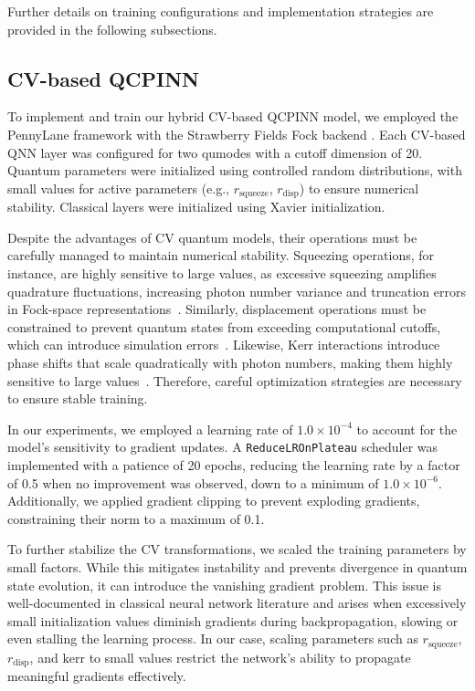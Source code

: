 Further details on training configurations and implementation strategies are provided in the following subsections.

\subsection{CV-based QCPINN}

To implement and train our hybrid CV-based QCPINN model, we employed the PennyLane framework \cite{bergholm2018pennylane} with the Strawberry Fields Fock backend \cite{killoran2019strawberry}. Each CV-based QNN layer was configured for two qumodes with a cutoff dimension of 20. Quantum parameters were initialized using controlled random distributions, with small values for active parameters (e.g., $r_{\text{squeeze}}$, $r_{\text{disp}}$) to ensure numerical stability. Classical layers were initialized using Xavier initialization.
  
Despite the advantages of CV quantum models, their operations must be carefully managed to maintain numerical stability. Squeezing operations, for instance, are highly sensitive to large values, as excessive squeezing amplifies quadrature fluctuations, increasing photon number variance and truncation errors in Fock-space representations~\cite{lvovsky2015squeezed}. Similarly, displacement operations must be constrained to prevent quantum states from exceeding computational cutoffs, which can introduce simulation errors~\cite{ferraro2005gaussian}. Likewise, Kerr interactions introduce phase shifts that scale quadratically with photon numbers, making them highly sensitive to large values~\cite{drummond1980quantum}. Therefore, careful optimization strategies are necessary to ensure stable training. 

In our experiments, we employed a learning rate of $1.0 \times 10^{-4}$ to account for the model’s sensitivity to gradient updates. A \texttt{ReduceLROnPlateau} scheduler was implemented with a patience of 20 epochs, reducing the learning rate by a factor of 0.5 when no improvement was observed, down to a minimum of $1.0 \times 10^{-6}$. Additionally, we applied gradient clipping to prevent exploding gradients, constraining their norm to a maximum of 0.1.
  
To further stabilize the CV transformations, we scaled the training parameters by small factors. While this mitigates instability and prevents divergence in quantum state evolution, it can introduce the vanishing gradient problem. This issue is well-documented in classical neural network literature and arises when excessively small initialization values diminish gradients during backpropagation, slowing or even stalling the learning process. In our case, scaling parameters such as $r_{\text{squeeze}}$, $r_{\text{disp}}$, and ${\text{kerr}}$ to small values restrict the network's ability to propagate meaningful gradients effectively. 

